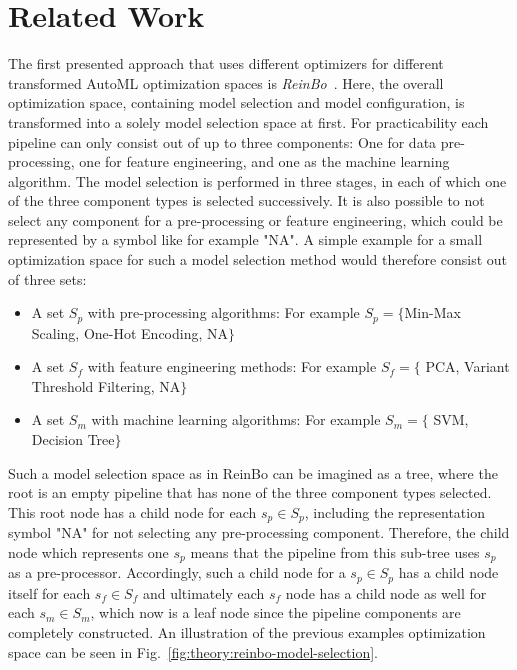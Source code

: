 \section{Related Work}
\label{sec:theory:related}
The first presented approach that uses different optimizers for different transformed AutoML optimization spaces is \textit{ReinBo}~\cite{Sun-ReinBo}.
Here, the overall optimization space, containing model selection and model configuration, is transformed into a solely model selection space at first.
For practicability each pipeline can only consist out of up to three components: One for data pre-processing, one for feature engineering, and one as the machine learning algorithm.
The model selection is performed in three stages, in each of which one of the three component types is selected successively.
It is also possible to not select any component for a pre-processing or feature engineering, which could be represented by a symbol like for example "NA".
A simple example for a small optimization space for such a model selection method would therefore consist out of three sets:
\begin{itemize}
    \item A set $S_p$ with pre-processing algorithms: For example $S_p=\{$Min-Max Scaling, One-Hot Encoding, NA$\}$
    \item A set $S_f$ with feature engineering methods: For example $S_f=\{$ PCA, Variant Threshold Filtering, NA$\}$
    \item A set $S_m$ with machine learning algorithms: For example $S_m=\{$ SVM, Decision Tree$\}$
\end{itemize}
Such a model selection space as in ReinBo can be imagined as a tree, where the root is an empty pipeline that has none of the three component types selected.
This root node has a child node for each $s_p \in S_p$, including the representation symbol "NA" for not selecting any pre-processing component.
Therefore, the child node which represents one $s_p$ means that the pipeline from this sub-tree uses $s_p$ as a pre-processor.
Accordingly, such a child node for a $s_p \in S_p$ has a child node itself for each $s_f \in S_f$ and ultimately each $s_f$ node has a child node as well for each $s_m \in S_m$, which now is a leaf node since the pipeline components are completely constructed.
An illustration of the previous examples optimization space can be seen in Fig.~\ref{fig:theory:reinbo-model-selection}.
